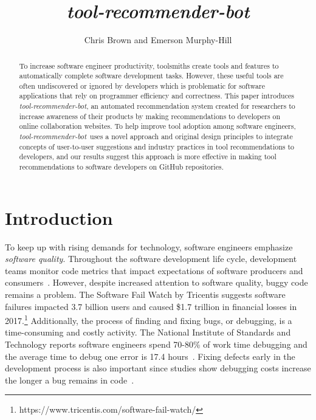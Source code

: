 \documentclass[sigconf,review,anonymous]{acmart}
\newcommand{\tool}{\textsl{tool-recommender-bot}}
\begin{document}

\title{\tool}

\author{Chris Brown and Emerson Murphy-Hill}

\begin{abstract}
To increase software engineer productivity, toolsmiths create tools and features to automatically complete software development tasks. However, these useful tools are often undiscovered or ignored by developers which is problematic for software applications that rely on programmer efficiency and correctness. This paper introduces \tool, an automated recommendation system created for researchers to increase awareness of their products by making recommendations to developers on online collaboration websites. To help improve tool adoption among software engineers, \tool~uses a novel approach and original design principles to integrate concepts of user-to-user suggestions and industry practices in tool recommendations to developers, and our results suggest this approach is more effective in making tool recommendations to software developers on GitHub repositories.
\end{abstract}

\maketitle

\section{Introduction}

To keep up with rising demands for technology, software engineers emphasize \textit{software quality}. Throughout the software development life cycle, development teams monitor code metrics that impact expectations of software producers and consumers~\cite{KitchenhamQualityTarget}. However, despite increased attention to software quality, buggy code remains a problem. The Software Fail Watch by Tricentis suggests software failures impacted 3.7 billion users and caused \$1.7 trillion in financial losses in 2017.\footnote{https://www.tricentis.com/software-fail-watch/} Additionally, the process of finding and fixing bugs, or debugging, is a time-consuming and costly activity. The National Institute of Standards and Technology reports software engineers spend 70-80\% of work time debugging and the average time to debug one error is 17.4 hours~\cite{NIST}. Fixing defects early in the development process is also important since studies show debugging costs increase the longer a bug remains in code~\cite{SEEconomics, SoftwareAssuranceSDLC}.
\end{document}
